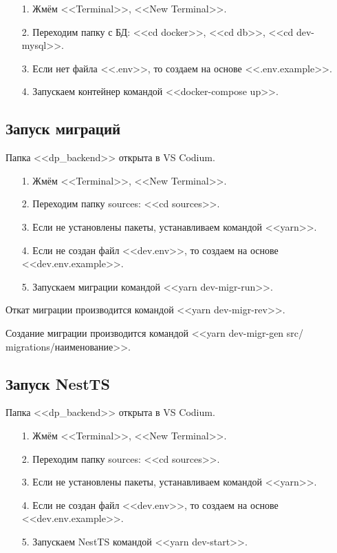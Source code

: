 \begin{enumerate}
    \item[1.] Жмём <<Terminal>>, <<New Terminal>>.
    \item[2.] Переходим папку с БД: <<cd docker>>, <<cd db>>, <<cd dev-mysql>>.
    \item[3.] Если нет файла <<.env>>, то создаем на основе <<.env.example>>.
    \item[4.] Запускаем контейнер командой <<docker-compose up>>.
\end{enumerate}

\subsection{Запуск миграций}

Папка <<dp\_backend>> открыта в VS Codium.

\begin{enumerate}
    \item[1.] Жмём <<Terminal>>, <<New Terminal>>.
    \item[2.] Переходим папку sources: <<cd sources>>.
    \item[3.] Если не установлены пакеты, устанавливаем командой <<yarn>>.
    \item[4.] Если не создан файл <<dev.env>>, то создаем на основе <<dev.env.example>>.
    \item[5.] Запускаем миграции командой <<yarn dev-migr-run>>.
\end{enumerate}

Откат миграции производится командой <<yarn dev-migr-rev>>.

Создание миграции производится командой <<yarn dev-migr-gen src/\\migrations/наименование>>.

\subsection{Запуск NestTS}

Папка <<dp\_backend>> открыта в VS Codium.

\begin{enumerate}
    \item[1.] Жмём <<Terminal>>, <<New Terminal>>.
    \item[2.] Переходим папку sources: <<cd sources>>.
    \item[3.] Если не установлены пакеты, устанавливаем командой <<yarn>>.
    \item[4.] Если не создан файл <<dev.env>>, то создаем на основе <<dev.env.example>>.
    \item[5.] Запускаем NestTS командой <<yarn dev-start>>.
\end{enumerate}
